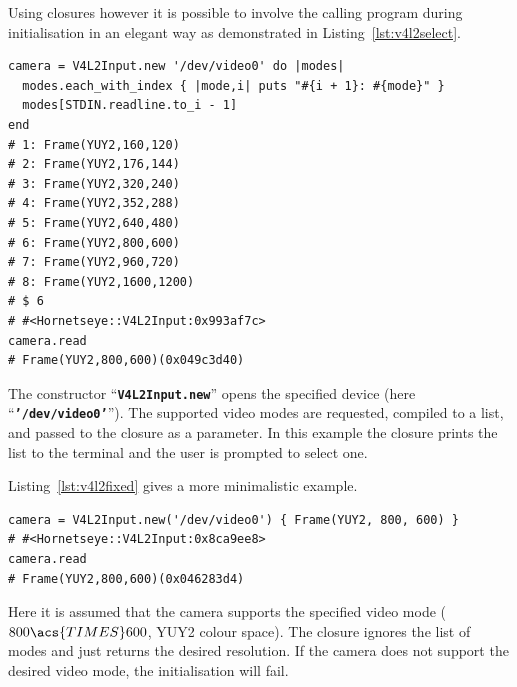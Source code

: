 \documentclass[12pt,a4paper,oneside,openright]{book}
\newcommand{\lst}[1]{Listing~\ref{lst:#1}}
\newcommand{\code}[1]{``\texttt{\textbf{\textcolor{codegray}{\small{#1}}}}''}
\begin{document}
\begin{CJK}{UTF8}{}
Using closures however it is possible to involve the calling program during initialisation in an elegant way as demonstrated in \lst{v4l2select}.
\lstset{language=Ruby,frame=single,numbers=none}
\begin{lstlisting}[float,caption={Opening a V4L2 device and negotiating a video mode},label=lst:v4l2select]
camera = V4L2Input.new '/dev/video0' do |modes|
  modes.each_with_index { |mode,i| puts "#{i + 1}: #{mode}" }
  modes[STDIN.readline.to_i - 1]
end
# 1: Frame(YUY2,160,120)
# 2: Frame(YUY2,176,144)
# 3: Frame(YUY2,320,240)
# 4: Frame(YUY2,352,288)
# 5: Frame(YUY2,640,480)
# 6: Frame(YUY2,800,600)
# 7: Frame(YUY2,960,720)
# 8: Frame(YUY2,1600,1200)
# $ 6
# #<Hornetseye::V4L2Input:0x993af7c>
camera.read
# Frame(YUY2,800,600)(0x049c3d40)
\end{lstlisting}
The constructor \code{V4L2Input.new} opens the specified device (here \code{'/dev/video0'}). The supported video modes are requested, compiled to a list, and passed to the closure as a parameter. In this example the closure prints the list to the terminal and the user is prompted to select one.

\lst{v4l2fixed} gives a more minimalistic example.
\begin{lstlisting}[float,caption={Opening a V4L2 device and selecting a fixed mode},label=lst:v4l2fixed]
camera = V4L2Input.new('/dev/video0') { Frame(YUY2, 800, 600) }
# #<Hornetseye::V4L2Input:0x8ca9ee8>
camera.read
# Frame(YUY2,800,600)(0x046283d4)
\end{lstlisting}
Here it is assumed that the camera supports the specified video mode ($800\acs{TIMES} 600$, YUY2 colour space). The closure ignores the list of modes and just returns the desired resolution. If the camera does not support the desired video mode, the initialisation will fail.


\end{CJK}
\end{document}
